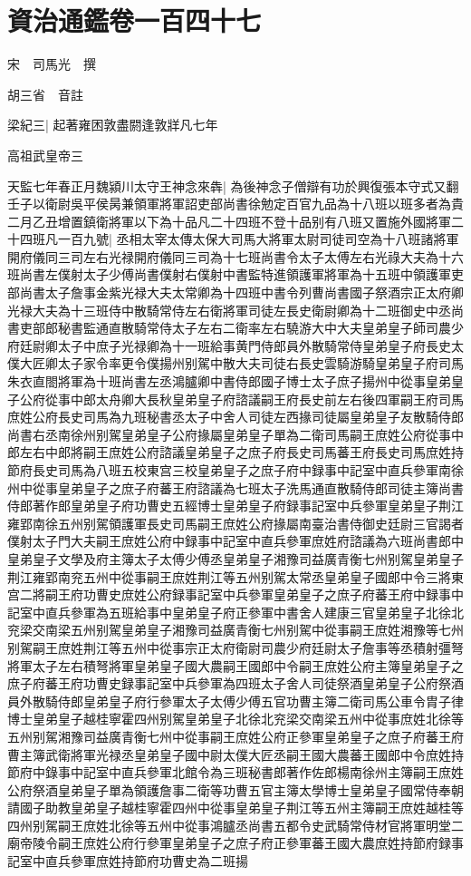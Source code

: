 \chapter{資治通鑑卷一百四十七}
宋　司馬光　撰

胡三省　音註

梁紀三|{
	起著雍困敦盡閼逢敦牂凡七年}


高祖武皇帝三

天監七年春正月魏潁川太守王神念來犇|{
	為後神念子僧辯有功於興復張本守式又翻}
壬子以衛尉吳平侯昺兼領軍將軍詔吏部尚書徐勉定百官九品為十八班以班多者為貴二月乙丑增置鎮衛將軍以下為十品凡二十四班不登十品别有八班又置施外國將軍二十四班凡一百九號|{
	丞相太宰太傳太保大司馬大將軍太尉司徒司空為十八班諸將軍開府儀同三司左右光禄開府儀同三司為十七班尚書令太子太傅左右光祿大夫為十六班尚書左僕射太子少傅尚書僕射右僕射中書監特進領護軍將軍為十五班中領護軍吏部尚書太子詹事金紫光禄大夫太常卿為十四班中書令列曹尚書國子祭酒宗正太府卿光禄大夫為十三班侍中散騎常侍左右衛將軍司徒左長史衛尉卿為十二班御史中丞尚書吏部郎秘書監通直散騎常侍太子左右二衛率左右驍游大中大夫皇弟皇子師司農少府廷尉卿太子中庶子光禄卿為十一班給事黄門侍郎員外散騎常侍皇弟皇子府長史太僕大匠卿太子家令率更令僕揚州别駕中散大夫司徒右長史雲騎游騎皇弟皇子府司馬朱衣直閤將軍為十班尚書左丞鴻臚卿中書侍郎國子博士太子庶子揚州中從事皇弟皇子公府從事中郎太舟卿大長秋皇弟皇子府諮議嗣王府長史前左右後四軍嗣王府司馬庶姓公府長史司馬為九班秘書丞太子中舍人司徒左西掾司徒屬皇弟皇子友散騎侍郎尚書右丞南徐州别駕皇弟皇子公府掾屬皇弟皇子單為二衛司馬嗣王庶姓公府從事中郎左右中郎將嗣王庶姓公府諮議皇弟皇子之庶子府長史司馬蕃王府長史司馬庶姓持節府長史司馬為八班五校東宫三校皇弟皇子之庶子府中録事中記室中直兵參軍南徐州中從事皇弟皇子之庶子府蕃王府諮議為七班太子洗馬通直散騎侍郎司徒主簿尚書侍郎著作郎皇弟皇子府功曹史五經博士皇弟皇子府録事記室中兵參軍皇弟皇子荆江雍郢南徐五州别駕領護軍長史司馬嗣王庶姓公府掾屬南臺治書侍御史廷尉三官謁者僕射太子門大夫嗣王庶姓公府中録事中記室中直兵參軍庶姓府諮議為六班尚書郎中皇弟皇子文學及府主簿太子太傅少傅丞皇弟皇子湘豫司益廣青衡七州别駕皇弟皇子荆江雍郢南兖五州中從事嗣王庶姓荆江等五州别駕太常丞皇弟皇子國郎中令三將東宫二將嗣王府功曹史庶姓公府録事記室中兵參軍皇弟皇子之庶子府蕃王府中録事中記室中直兵參軍為五班給事中皇弟皇子府正參軍中書舍人建康三官皇弟皇子北徐北兖梁交南梁五州别駕皇弟皇子湘豫司益廣青衡七州别駕中從事嗣王庶姓湘豫等七州别駕嗣王庶姓荆江等五州中從事宗正太府衛尉司農少府廷尉太子詹事等丞積射彊弩將軍太子左右積弩將軍皇弟皇子國大農嗣王國郎中令嗣王庶姓公府主簿皇弟皇子之庶子府蕃王府功曹史録事記室中兵參軍為四班太子舍人司徒祭酒皇弟皇子公府祭酒員外散騎侍郎皇弟皇子府行參軍太子太傅少傅五官功曹主簿二衛司馬公車令胄子律博士皇弟皇子越桂寧霍四州别駕皇弟皇子北徐北兖梁交南梁五州中從事庶姓北徐等五州别駕湘豫司益廣青衡七州中從事嗣王庶姓公府正參軍皇弟皇子之庶子府蕃王府曹主簿武衛將軍光禄丞皇弟皇子國中尉太僕大匠丞嗣王國大農蕃王國郎中令庶姓持節府中錄事中記室中直兵參軍北館令為三班秘書郎著作佐郎楊南徐州主簿嗣王庶姓公府祭酒皇弟皇子單為領護詹事二衛等功曹五官主簿太學博士皇弟皇子國常侍奉朝請國子助教皇弟皇子越桂寧霍四州中從事皇弟皇子荆江等五州主簿嗣王庶姓越桂等四州别駕嗣王庶姓北徐等五州中從事鴻臚丞尚書五都令史武騎常侍材官將軍明堂二廟帝陵令嗣王庶姓公府行參軍皇弟皇子之庶子府正參軍蕃王國大農庶姓持節府録事記室中直兵參軍庶姓持節府功曹史為二班揚}
